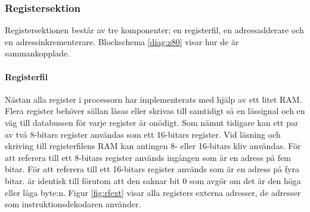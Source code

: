 \documentclass[main.tex]{subfiles}
\begin{document}
\newpage
\subsubsection{Registersektion}
Registersektionen består av tre komponenter; en registerfil, en
adressadderare och en adressinkrementerare. Blockschema \ref{diag:z80} visar
hur de är sammankopplade.

\paragraph{Registerfil}
Nästan alla register i processorn har implementerats med hjälp av ett litet
RAM. Flera register behöver sällan läsas eller skrivas till samtidigt så en
lässignal och en väg till databussen för varje register är onödigt. Som nämnt
tidigare kan ett par av två 8-bitars register användas som ett 16-bitars
register. Vid läsning och skriving till registerfilens RAM kan antingen 8-
eller 16-bitars kliv användas. För att referera till ett 8-bitars register
används ingången  som är en adress på fem bitar. För att referera
till ett 16-bitars register används  som är en adress på fyra
bitar.  är identisk till  förutom att den saknar bit 0
som avgör om det är den höga eller låga byte:n. Figur \ref{fig:rfext} visar
alla registers externa adresser, de adresser som instruktionsdekodaren
använder.
\end{document}
